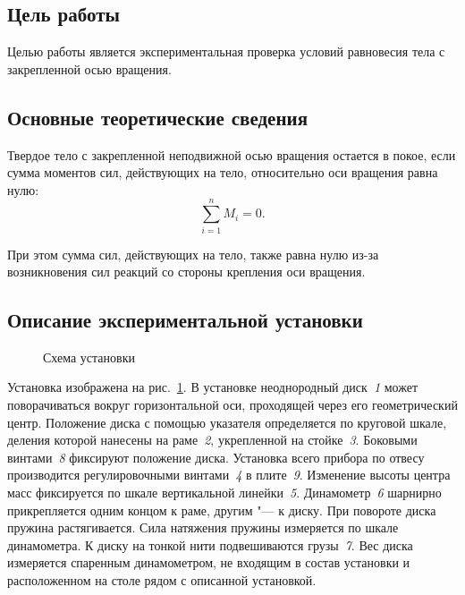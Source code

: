\documentclass[a4paper, 12pt]{extarticle}
\newcommand{\isum}{\sum\limits_{i=1}^{n}}
\begin{document}
\MTDTitlePage
\MTDInfoPage

\setcounter{section}{6}

\subsection{Цель работы}
Целью работы является экспериментальная проверка условий равновесия тела с закрепленной осью вращения.

\subsection{Основные теоретические сведения}
Твердое тело с закрепленной неподвижной осью вращения остается в  покое, если сумма моментов сил, действующих на тело, относительно оси вращения равна нулю:
\begin{equation}
\label{eq:m6-moment}
\isum M_i = 0. %
\end{equation}

При этом сумма сил, действующих на тело, также равна нулю из-за возникновения сил реакций со стороны крепления оси вращения.

\subsection{Описание экспериментальной установки}

\begin{figure}[h]
\begin{center}
\end{center}
\caption{Схема установки \label{fig:m6-disk-device}}
\end{figure}

Установка изображена на рис.~\ref{fig:m6-disk-device}. В установке неоднородный диск~\emph{1} может поворачиваться вокруг горизонтальной оси, проходящей через его геометрический центр. Положение диска с помощью указателя определяется по круговой шкале, деления которой нанесены на раме~\emph{2}, укрепленной на стойке~\emph{3}. Боковыми винтами~\emph{8} фиксируют положение диска.  Установка всего прибора по отвесу производится регулировочными винтами~\emph{4} в плите~\emph{9}. Изменение высоты центра масс фиксируется по шкале вертикальной линейки~\emph{5}. Динамометр~\emph{6} шарнирно прикрепляется одним концом к раме, другим "--- к диску. При повороте диска пружина растягивается. Сила натяжения пружины измеряется по шкале динамометра. К диску на тонкой нити подвешиваются грузы~\emph{7}. Вес диска измеряется спаренным динамометром, не входящим в состав установки и расположенном на столе рядом с описанной  установкой. %
\end{document}

